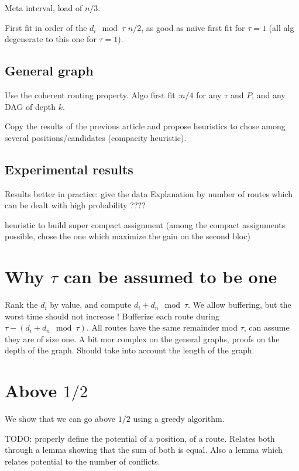 \documentclass[10pt, conference, letterpaper]{IEEEtran}
\begin{document}
Meta interval, load of $n/3$.

First fit in order of the $d_i \mod \tau$ $n/2$, as good as naive first fit for 
$\tau = 1$ (all alg degenerate to this one for $\tau =1$).

\subsection{General graph}

Use the coherent routing property.
Algo first fit :$n/4$ for any $\tau$ and $P$, and any DAG of depth $k$. 

Copy the results of the previous article and propose heuristics to chose among several positions/candidates (compacity heuristic).

\subsection{Experimental results}

Results better in practice: give the data
Explanation by number of routes which can be dealt with high probability ???? 
 
 heuristic to build super compact assignment (among the compact assignments
possible, chose the one which maximize the gain on the second bloc)

\section{Why $\tau$ can be assumed to be one}

Rank the $d_i$ by value, and compute $d_i + d_n \mod \tau$.
We allow buffering, but the worst time should not increase !
Bufferize  each route during $\tau - (d_i + d_n \mod \tau)$.
All routes have the same remainder mod $\tau$, can assume they are of 
size one.
A bit mor complex on the general graphs, proofs on the depth of the graph. 
Should take into account the length of the graph.


\section{Above $1/2$}

We show that we can go above $1/2$ using a greedy algorithm.

TODO: properly define the potential of a position, of a route. Relates both through a lemma 
showing that the sum of both is equal. 
Also a lemma which relates potential to the number of conflicts. 
\end{document}
